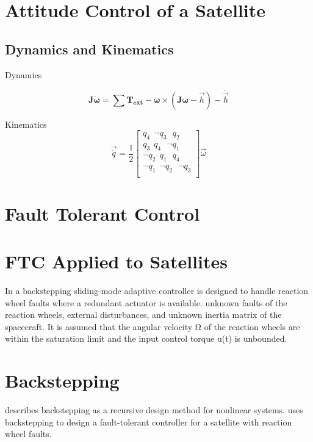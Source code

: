 \section{Attitude Control of a Satellite}
\subsection{Dynamics and Kinematics}
Dynamics

\begin{equation}
\mathbf{J}\mathbf{\dot{\omega}} = \sum{\mathbf{T_{ext}}} -\mathbf{\omega}\times(\mathbf{J}\mathbf{\omega}-\vec{h})-\dot{\vec{h}}
\end{equation}

Kinematics
\begin{equation}
\vec{\dot{q}}=\frac{1}{2}
\begin{bmatrix}
q_{4} \ \ \neg q_{3} \ \ \ q_{2} \\ 
q_{3} \ \ q_{4} \ \ \ \neg q_{1} \\ 
\neg q_{2} \ \ q_{1} \ \ \ q_{4} \\ 
\neg q_{1} \ \ \neg q_{2} \ \ \ \neg q_{3} \\
\end{bmatrix} \vec{\omega}
\end{equation}
\subsection{}
\section{Fault Tolerant Control}

\section{FTC Applied to Satellites}
In \cite{JiangYe2010Abfc} a backstepping sliding-mode adaptive controller is designed to handle reaction wheel faults where a 
redundant actuator is available. unknown faults of the reaction wheels, external disturbances, and unknown
inertia matrix of the spacecraft. 
It is assumed that the angular velocity Ω of the reaction wheels are within the saturation limit and the input control torque 
u(t) is unbounded.

\section{Backstepping}
\cite{khalilNonlinearSystems2002} describes backstepping as a recursive design method for nonlinear systems.
\cite{ShenQiang2019AFCS} uses backstepping to design a fault-tolerant controller for a satellite with reaction wheel faults.